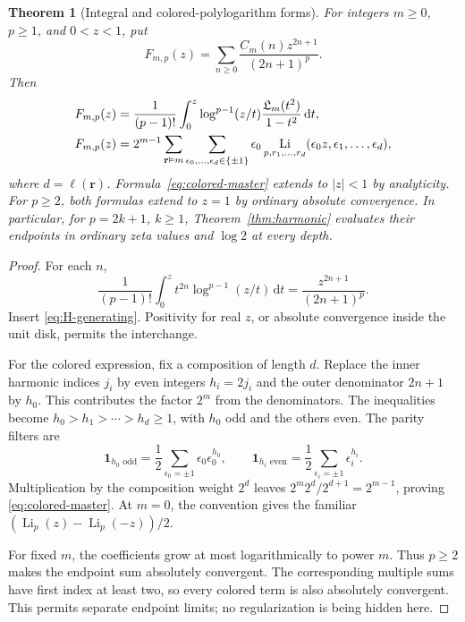 \documentclass[11pt,a4paper]{article}
\numberwithin{equation}{section}
\newtheorem{theorem}{Theorem}[section]
\theoremstyle{definition}\newtheorem{definition}[theorem]{Definition}
\theoremstyle{remark}\newtheorem{remark}[theorem]{Remark}
\DeclareMathOperator{\Li}{Li}
\newcommand{\dd}{\,\mathrm d}
\begin{document}
\begin{theorem}[Integral and colored-polylogarithm forms]
\label{thm:polylog}
For integers $m\ge0$, $p\ge1$, and $0<z<1$, put
\begin{equation}
 F_{m,p}(z)=\sum_{n\ge0}\frac{C_m(n)z^{2n+1}}{(2n+1)^p}.
 \label{eq:Fmp}
\end{equation}
Then
\begin{align}
 F_{m,p}(z)&=\frac1{(p-1)!}\int_0^z
        \log^{p-1}(z/t)\frac{\Lcal_m(t^2)}{1-t^2}\dd t,
        \label{eq:integral-master}\\
 F_{m,p}(z)&=2^{m-1}\sum_{\mathbf r\vDash m}
       \sum_{\epsilon_0,\ldots,\epsilon_d\in\{\pm1\}}
       \epsilon_0\Li_{p,r_1,\ldots,r_d}
                  (\epsilon_0z,\epsilon_1,\ldots,\epsilon_d),
        \label{eq:colored-master}
\end{align}
where $d=\ell(\mathbf r)$. Formula~\eqref{eq:colored-master} extends
to $|z|<1$ by analyticity. For $p\ge2$, both formulas extend to $z=1$
by ordinary absolute convergence. In particular, for $p=2k+1$, $k\ge1$,
Theorem~\ref{thm:harmonic} evaluates their endpoints in ordinary zeta
values and $\log2$ at every depth.
\end{theorem}
\begin{proof}
For each $n$,
\[
 \frac1{(p-1)!}\int_0^z t^{2n}\log^{p-1}(z/t)\dd t
       =\frac{z^{2n+1}}{(2n+1)^p}.
\]
Insert \eqref{eq:H-generating}. Positivity for real $z$, or absolute
convergence inside the unit disk, permits the interchange.

For the colored expression, fix a composition of length $d$. Replace
the inner harmonic indices $j_i$ by even integers $h_i=2j_i$ and
the outer denominator $2n+1$ by $h_0$. This contributes the factor
$2^m$ from the denominators. The inequalities become
$h_0>h_1>\cdots>h_d\ge1$, with $h_0$ odd and the others even.
The parity filters are
\[
 \mathbf1_{h_0\text{ odd}}=\frac12\sum_{\epsilon_0=\pm1}
                       \epsilon_0\epsilon_0^{h_0},\qquad
 \mathbf1_{h_i\text{ even}}=\frac12\sum_{\epsilon_i=\pm1}
                       \epsilon_i^{h_i}.
\]
Multiplication by the composition weight $2^d$ leaves
$2^m2^d/2^{d+1}=2^{m-1}$, proving \eqref{eq:colored-master}.
At $m=0$, the convention gives the familiar
$(\Li_p(z)-\Li_p(-z))/2$.

For fixed $m$, the coefficients grow at most logarithmically to
power $m$. Thus $p\ge2$ makes the endpoint sum absolutely convergent.
The corresponding multiple sums have first index at least two,
so every colored term is also absolutely convergent. This permits
separate endpoint limits; no regularization is being hidden here.
\end{proof}
\end{document}
